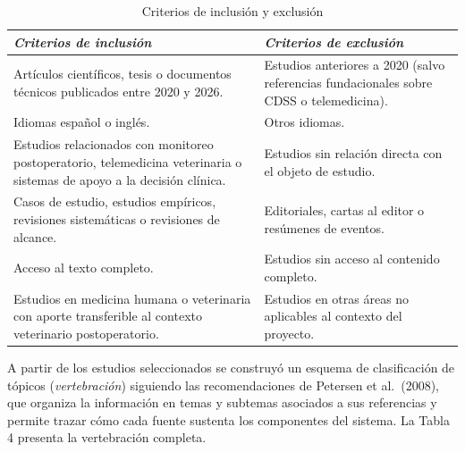 \documentclass[stu, spanish]{apa7}
\begin{document}
\begin{table}[htbp]
\caption{Criterios de inclusi\'{o}n y exclusi\'{o}n}
\label{tab:criterios}
\footnotesize
\begin{tabular}{@{}p{6cm}p{6cm}@{}}
\toprule
\textit{Criterios de inclusi\'{o}n} & \textit{Criterios de exclusi\'{o}n} \\
\midrule
Art\'{i}culos cient\'{i}ficos, tesis o documentos t\'{e}cnicos publicados entre 2020 y 2026. & Estudios anteriores a 2020 (salvo referencias fundacionales sobre CDSS o telemedicina). \\
Idiomas espa\~{n}ol o ingl\'{e}s. & Otros idiomas. \\
Estudios relacionados con monitoreo postoperatorio, telemedicina veterinaria o sistemas de apoyo a la decisi\'{o}n cl\'{i}nica. & Estudios sin relaci\'{o}n directa con el objeto de estudio. \\
Casos de estudio, estudios emp\'{i}ricos, revisiones sistem\'{a}ticas o revisiones de alcance. & Editoriales, cartas al editor o res\'{u}menes de eventos. \\
Acceso al texto completo. & Estudios sin acceso al contenido completo. \\
Estudios en medicina humana o veterinaria con aporte transferible al contexto veterinario postoperatorio. & Estudios en otras \'{a}reas no aplicables al contexto del proyecto. \\
\bottomrule
\end{tabular}
\end{table}

A partir de los estudios seleccionados se construy\'{o} un esquema de clasificaci\'{o}n de t\'{o}picos (\textit{vertebraci\'{o}n}) siguiendo las recomendaciones de Petersen et al.\ (2008), que organiza la informaci\'{o}n en temas y subtemas asociados a sus referencias y permite trazar c\'{o}mo cada fuente sustenta los componentes del sistema. La Tabla 4 presenta la vertebraci\'{o}n completa.
\end{document}

